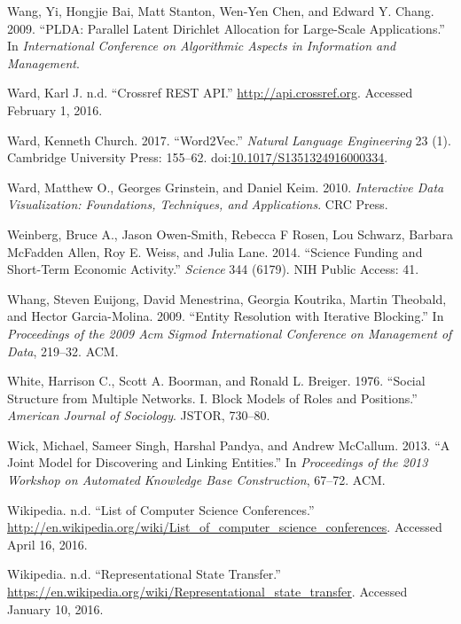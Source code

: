 \documentclass[]{krantz}
\begin{document}
\hypertarget{ref-wang-09}{}
Wang, Yi, Hongjie Bai, Matt Stanton, Wen-Yen Chen, and Edward Y. Chang.
2009. ``PLDA: Parallel Latent Dirichlet Allocation for Large-Scale
Applications.'' In \emph{International Conference on Algorithmic Aspects
in Information and Management}.

\hypertarget{ref-crossref}{}
Ward, Karl J. n.d. ``Crossref REST API.'' \url{http://api.crossref.org}.
Accessed February 1, 2016.

\hypertarget{ref-church-17}{}
Ward, Kenneth Church. 2017. ``Word2Vec.'' \emph{Natural Language
Engineering} 23 (1). Cambridge University Press: 155--62.
doi:\href{https://doi.org/10.1017/S1351324916000334}{10.1017/S1351324916000334}.

\hypertarget{ref-ward2010interactive}{}
Ward, Matthew O., Georges Grinstein, and Daniel Keim. 2010.
\emph{Interactive Data Visualization: Foundations, Techniques, and
Applications}. CRC Press.

\hypertarget{ref-weinberg2014science}{}
Weinberg, Bruce A., Jason Owen-Smith, Rebecca F Rosen, Lou Schwarz,
Barbara McFadden Allen, Roy E. Weiss, and Julia Lane. 2014. ``Science
Funding and Short-Term Economic Activity.'' \emph{Science} 344 (6179).
NIH Public Access: 41.

\hypertarget{ref-whang2009entity}{}
Whang, Steven Euijong, David Menestrina, Georgia Koutrika, Martin
Theobald, and Hector Garcia-Molina. 2009. ``Entity Resolution with
Iterative Blocking.'' In \emph{Proceedings of the 2009 Acm Sigmod
International Conference on Management of Data}, 219--32. ACM.

\hypertarget{ref-white1976social}{}
White, Harrison C., Scott A. Boorman, and Ronald L. Breiger. 1976.
``Social Structure from Multiple Networks. I. Block Models of Roles and
Positions.'' \emph{American Journal of Sociology}. JSTOR, 730--80.

\hypertarget{ref-wick2013joint}{}
Wick, Michael, Sameer Singh, Harshal Pandya, and Andrew McCallum. 2013.
``A Joint Model for Discovering and Linking Entities.'' In
\emph{Proceedings of the 2013 Workshop on Automated Knowledge Base
Construction}, 67--72. ACM.

\hypertarget{ref-CSConf}{}
Wikipedia. n.d. ``List of Computer Science Conferences.''
\url{http://en.wikipedia.org/wiki/List_of_computer_science_conferences}.
Accessed April 16, 2016.

\hypertarget{ref-RESTwiki}{}
Wikipedia. n.d. ``Representational State Transfer.''
\url{https://en.wikipedia.org/wiki/Representational_state_transfer}.
Accessed January 10, 2016.
\end{document}
